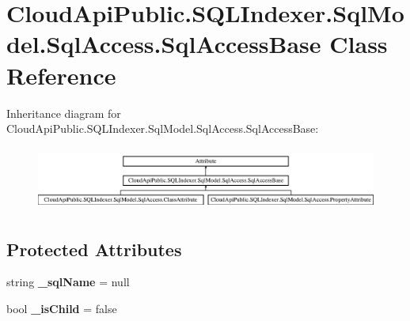 \hypertarget{class_cloud_api_public_1_1_s_q_l_indexer_1_1_sql_model_1_1_sql_access_1_1_sql_access_base}{\section{Cloud\-Api\-Public.\-S\-Q\-L\-Indexer.\-Sql\-Model.\-Sql\-Access.\-Sql\-Access\-Base Class Reference}
\label{class_cloud_api_public_1_1_s_q_l_indexer_1_1_sql_model_1_1_sql_access_1_1_sql_access_base}
}
Inheritance diagram for Cloud\-Api\-Public.\-S\-Q\-L\-Indexer.\-Sql\-Model.\-Sql\-Access.\-Sql\-Access\-Base\-:\begin{figure}[H]
\begin{center}
\leavevmode
\includegraphics[height=2.115869cm]{class_cloud_api_public_1_1_s_q_l_indexer_1_1_sql_model_1_1_sql_access_1_1_sql_access_base}
\end{center}
\end{figure}
\subsection*{Protected Attributes}
\begin{DoxyCompactItemize}
\item 
\hypertarget{class_cloud_api_public_1_1_s_q_l_indexer_1_1_sql_model_1_1_sql_access_1_1_sql_access_base_ac2b6a821a8bc7d7f6014cb6b0390c9b2}{string {\bfseries \-\_\-sql\-Name} = null}\label{class_cloud_api_public_1_1_s_q_l_indexer_1_1_sql_model_1_1_sql_access_1_1_sql_access_base_ac2b6a821a8bc7d7f6014cb6b0390c9b2}

\item 
\hypertarget{class_cloud_api_public_1_1_s_q_l_indexer_1_1_sql_model_1_1_sql_access_1_1_sql_access_base_a8aa6c0f868b9f34b15ff703e5b1fa35b}{bool {\bfseries \-\_\-is\-Child} = false}\label{class_cloud_api_public_1_1_s_q_l_indexer_1_1_sql_model_1_1_sql_access_1_1_sql_access_base_a8aa6c0f868b9f34b15ff703e5b1fa35b}

\end{DoxyCompactItemize}
